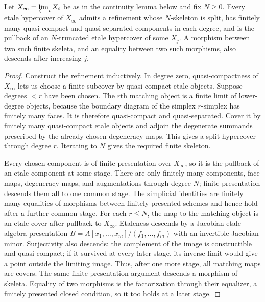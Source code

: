 \begin{lemma}
\label{lemma:weil-pbc-finite-hypercover-descent}
\uses{}

Let $X_\infty=\varprojlim_iX_i$ be as in the continuity lemma below and fix
$N\geq0$.  Every etale hypercover of $X_\infty$ admits a refinement whose
$N$-skeleton is split, has finitely many quasi-compact and quasi-separated
components in each degree, and is the pullback of an $N$-truncated etale
hypercover of some $X_j$.  A morphism between two such finite skeleta, and
an equality between two such morphisms, also descends after increasing $j$.
\end{lemma}
\begin{proof}

Construct the refinement inductively.  In degree zero, quasi-compactness of
$X_\infty$ lets us choose a finite subcover by quasi-compact etale objects.
Suppose degrees $<r$ have been chosen.  The $r$th matching object is a finite
limit of lower-degree objects, because the boundary diagram of the simplex
$r$-simplex has finitely many faces.  It is therefore quasi-compact and
quasi-separated.  Cover it by finitely many quasi-compact etale objects and
adjoin the degenerate summands prescribed by the already chosen degeneracy
maps.  This gives a split hypercover through degree $r$.  Iterating to $N$
gives the required finite skeleton.

Every chosen component is of finite presentation over $X_\infty$, so it is
the pullback of an etale component at some stage.  There are only finitely
many components, face maps, degeneracy maps, and augmentations through
degree $N$; finite presentation descends them all to one common stage.
The simplicial identities are finitely many equalities of morphisms between
finitely presented schemes and hence hold after a further common stage.
For each $r\leq N$, the map to the matching object is an etale cover after
pullback to $X_\infty$.  Etaleness descends by a Jacobian etale algebra
presentation
\(B=A[x_1,\ldots,x_m]/(f_1,\ldots,f_m)\) with an invertible Jacobian minor.
Surjectivity also descends: the complement of the image is constructible and
quasi-compact; if it survived at every later stage, its inverse limit would
give a point outside the limiting image.  Thus, after one more stage, all
matching maps are covers.  The same finite-presentation argument descends a
morphism of skeleta.  Equality of two morphisms is the factorization through
their equalizer, a finitely presented closed condition, so it too holds at a
later stage.
\end{proof}

